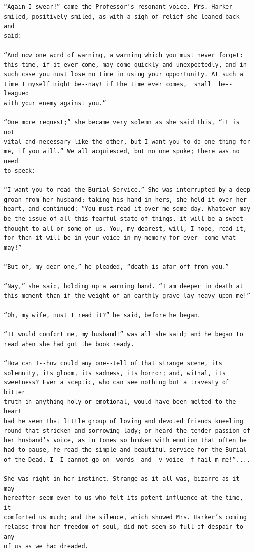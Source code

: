 \documentclass{article}
\begin{document}
\begin{verbatim}
“Again I swear!” came the Professor’s resonant voice. Mrs. Harker
smiled, positively smiled, as with a sigh of relief she leaned back and
said:--

“And now one word of warning, a warning which you must never forget:
this time, if it ever come, may come quickly and unexpectedly, and in
such case you must lose no time in using your opportunity. At such a
time I myself might be--nay! if the time ever comes, _shall_ be--leagued
with your enemy against you.”

“One more request;” she became very solemn as she said this, “it is not
vital and necessary like the other, but I want you to do one thing for
me, if you will.” We all acquiesced, but no one spoke; there was no need
to speak:--

“I want you to read the Burial Service.” She was interrupted by a deep
groan from her husband; taking his hand in hers, she held it over her
heart, and continued: “You must read it over me some day. Whatever may
be the issue of all this fearful state of things, it will be a sweet
thought to all or some of us. You, my dearest, will, I hope, read it,
for then it will be in your voice in my memory for ever--come what may!”

“But oh, my dear one,” he pleaded, “death is afar off from you.”

“Nay,” she said, holding up a warning hand. “I am deeper in death at
this moment than if the weight of an earthly grave lay heavy upon me!”

“Oh, my wife, must I read it?” he said, before he began.

“It would comfort me, my husband!” was all she said; and he began to
read when she had got the book ready.

“How can I--how could any one--tell of that strange scene, its
solemnity, its gloom, its sadness, its horror; and, withal, its
sweetness? Even a sceptic, who can see nothing but a travesty of bitter
truth in anything holy or emotional, would have been melted to the heart
had he seen that little group of loving and devoted friends kneeling
round that stricken and sorrowing lady; or heard the tender passion of
her husband’s voice, as in tones so broken with emotion that often he
had to pause, he read the simple and beautiful service for the Burial
of the Dead. I--I cannot go on--words--and--v-voice--f-fail m-me!”....

She was right in her instinct. Strange as it all was, bizarre as it may
hereafter seem even to us who felt its potent influence at the time, it
comforted us much; and the silence, which showed Mrs. Harker’s coming
relapse from her freedom of soul, did not seem so full of despair to any
of us as we had dreaded.



\end{verbatim}
\end{document}
